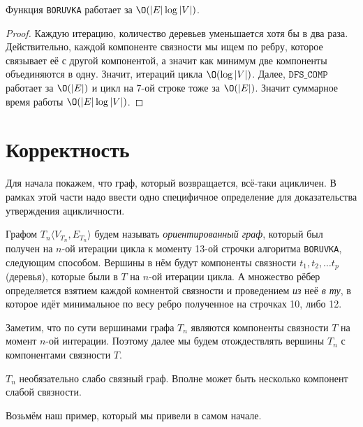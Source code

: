 \St Функция \texttt{BORUVKA} работает за $\O(|E| \log |V|)$.
\begin{proof}

    Каждую итерацию, количество деревьев уменьшается хотя бы в два раза. Действительно, каждой компоненте связности мы ищем по ребру, которое связывает её с другой компонентой, а значит как минимум две компоненты объединяются в одну.
    Значит, итераций цикла $\O(\log |V|)$. Далее, $\texttt{DFS\_COMP}$ работает за $\O(|E|)$ и цикл на 7-ой строке тоже за $\O(|E|)$. Значит суммарное время работы $\O(|E| \log |V|)$.

\end{proof}

\section{Корректность}

Для начала покажем, что граф, который возвращается, всё-таки ацикличен. В рамках этой части надо ввести одно специфичное определение для доказательства утверждения ацикличности.

\Def Графом $T_n\langle V_{T_n}, E_{T_n} \rangle$ будем называть \textit{ориентированный граф}, который был получен на $n$-ой итерации цикла к моменту 13-ой строчки алгоритма \texttt{BORUVKA}, следующим способом. 
Вершины в нём будут компоненты связности $t_1, t_2, \dots t_p$ (деревья), которые были в $T$ на $n$-ой итерации цикла. 
А множество рёбер определяется взятием каждой комнентой связности и проведением \textit{из} неё \textit{в ту}, в которое идёт минимальное по весу ребро полученное на строчках 10, либо 12.

\Note Заметим, что по сути вершинами графа $T_n$ являются компоненты связности $T$ на момент $n$-ой интерации. Поэтому далее мы будем отождествлять вершины $T_n$ с компонентами связности $T$.

\Note $T_n$ необязательно слабо связный граф. Вполне может быть несколько компонент слабой связности.

Возьмём наш пример, который мы привели в самом начале.

\begin{figure}[H]
    \centering
\end{figure}

